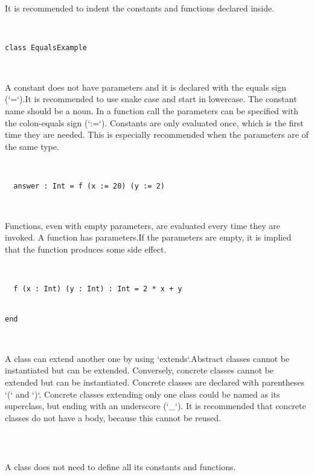 It is recommended to indent the constants and functions declared inside. 


\begin{lstlisting}


class EqualsExample



\end{lstlisting}

A constant does not have parameters and it is declared with the equals sign (`=`).It is recommended to use snake case and start in lowercase.
The constant name should be a noun.
In a function call the parameters can be specified with the colon-equals sign (`:=`).
Constants are only evaluated once, which is the first time they are needed. This is especially recommended when the parameters are of the same type.


\begin{lstlisting}


  answer : Int = f (x := 20) (y := 2)



\end{lstlisting}

Functions, even with empty parameters, are evaluated every time they are invoked. A function has parameters.If the parameters are empty, it is implied that the function produces some side effect.


\begin{lstlisting}


  f (x : Int) (y : Int) : Int = 2 * x + y


end



\end{lstlisting}

A class can extend another one by using `extends`.Abstract classes cannot be instantiated but can be extended.
Conversely, concrete classes cannot be extended but can be instantiated.
Concrete classes are declared with parentheses `(` and `)`.
Concrete classes extending only one class could be named as its superclass, but ending with an underscore (`_`). It is recommended that concrete classes do not have a body, because this cannot be reused.


\begin{lstlisting}



\end{lstlisting}

A class does not need to define all its constants and functions. 



